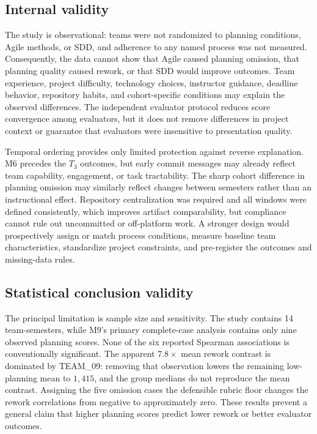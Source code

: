 \documentclass[conference]{IEEEtran}
\begin{document}
\subsection{Internal validity}

The study is observational: teams were not randomized to planning conditions,
Agile methods, or SDD, and adherence to any named process was not measured.
Consequently, the data cannot show that Agile caused planning omission, that
planning quality caused rework, or that SDD would improve outcomes. Team
experience, project difficulty, technology choices, instructor guidance,
deadline behavior, repository habits, and cohort-specific conditions may
explain the observed differences. The independent evaluator protocol reduces
score convergence among evaluators, but it does not remove differences in
project context or guarantee that evaluators were insensitive to presentation
quality.

Temporal ordering provides only limited protection against reverse
explanation. M6 precedes the $T_3$ outcomes, but early commit messages may
already reflect team capability, engagement, or task tractability. The sharp
cohort difference in planning omission may similarly reflect changes between
semesters rather than an instructional effect. Repository centralization was
required and all windows were defined consistently, which improves artifact
comparability, but compliance cannot rule out uncommitted or off-platform work.
A stronger design would prospectively assign or match process conditions,
measure baseline team characteristics, standardize project constraints, and
pre-register the outcomes and missing-data rules.

\subsection{Statistical conclusion validity}

The principal limitation is sample size and sensitivity. The study contains
14 team-semesters, while M9's primary complete-case analysis contains only nine
observed planning scores. None of the six reported Spearman associations is
conventionally significant. The apparent $7.8\times$ mean rework contrast is
dominated by TEAM\_09: removing that observation lowers the remaining
low-planning mean to $1{,}415$, and the group medians do not reproduce the mean
contrast. Assigning the five omission cases the defensible rubric floor changes
the rework correlations from negative to approximately zero. These results
prevent a general claim that higher planning scores predict lower rework or
better evaluator outcomes.
\end{document}
